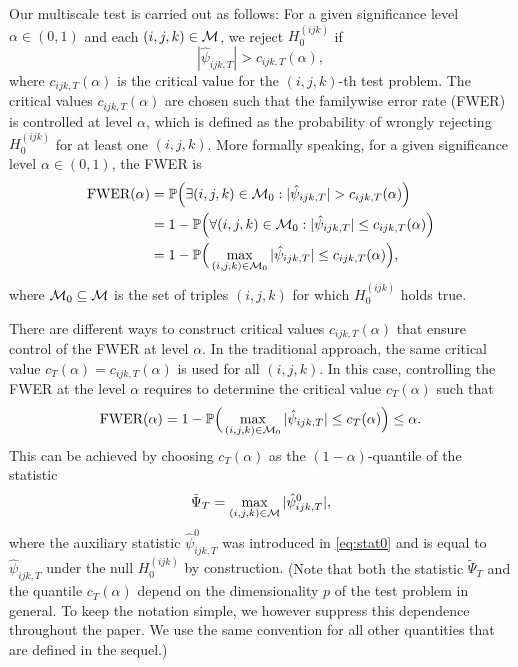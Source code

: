 \documentclass[a4paper,12pt]{article}
\numberwithin{equation}{section}
\begin{document}
Our multiscale test is carried out as follows: For a given significance level $\alpha \in (0,1)$ and each $(i,j,k) \in \mathcal{M}$, we reject $H_0^{(ijk)}$ if 
\[ |\hat{\psi}_{ijk,T}| > c_{ijk,T}(\alpha), \]
where $c_{ijk,T}(\alpha)$ is the critical value for the $(i,j,k)$-th test problem. The critical values $c_{ijk,T}(\alpha)$ are chosen such that the familywise error rate (FWER) is controlled at level $\alpha$, which is defined as the probability of wrongly rejecting $H_0^{(ijk)}$ for at least one $(i,j,k)$. More formally speaking, for a given significance level $\alpha \in (0,1)$, the FWER is 
\begin{align*}
\text{FWER}(\alpha) 
 & = \mathbb{P} \Big( \exists (i,j,k) \in \mathcal{M}_0: |\hat{\psi}_{ijk,T}| > c_{ijk,T}(\alpha) \Big) \\
 & =  1 - \mathbb{P} \Big( \forall (i,j,k) \in \mathcal{M}_0: |\hat{\psi}_{ijk,T}| \le c_{ijk,T}(\alpha) \Big) \\
 & = 1 - \mathbb{P}\Big( \max_{(i,j,k) \in \mathcal{M}_0} |\hat{\psi}_{ijk,T}| \le c_{ijk,T}(\alpha) \Big), 
\end{align*}
where $\mathcal{M}_0 \subseteq \mathcal{M}$ is the set of triples $(i,j,k)$ for which $H_0^{(ijk)}$ holds true.  


There are different ways to construct critical values $c_{ijk,T}(\alpha)$ that ensure control of the FWER at level $\alpha$. In the traditional approach, the same critical value $c_T(\alpha) = c_{ijk,T}(\alpha)$ is used for all $(i,j,k)$. In this case, controlling the FWER at the level $\alpha$ requires to determine the critical value $c_T(\alpha)$ such that
\begin{equation}\label{eq:FWER-tilde}
\text{FWER}(\alpha) = 1 - \mathbb{P}\Big( \max_{(i,j,k) \in \mathcal{M}_0} |\hat{\psi}_{ijk,T}| \le c_T(\alpha) \Big) \le \alpha. 
\end{equation}
This can be achieved by choosing $c_T(\alpha)$ as the $(1-\alpha)$-quantile of the statistic 
\[ \tilde{\Psi}_T = \max_{(i,j,k) \in \mathcal{M}} |\hat{\psi}_{ijk,T}^0|, \]
where {\color{red} the auxiliary statistic $\hat{\psi}_{ijk,T}^0$ was introduced in \eqref{eq:stat0} and is equal to $\hat{\psi}_{ijk,T}$ under the null $H_0^{(ijk)}$ by construction.} 
(Note that both the statistic $\tilde{\Psi}_T$ and the quantile $c_T(\alpha)$ depend on the dimensionality $p$ of the test problem in general. To keep the notation simple, we however suppress this dependence throughout the paper. We use the same convention for all other quantities that are defined in the sequel.) 
\end{document}

